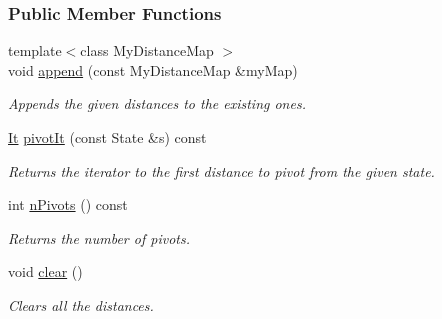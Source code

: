 \subsubsection*{Public Member Functions}
\begin{DoxyCompactItemize}
\item 
{\footnotesize template$<$class My\+Distance\+Map $>$ }\\void \hyperlink{structslb_1_1ext_1_1heuristic_1_1differential_1_1DistancesToPivots_3_01State_00_01Index_00_01IndexKind_1_1none_01_4_a126e633fa3a611519726896247b33527}{append} (const My\+Distance\+Map \&my\+Map)
\begin{DoxyCompactList}\small\item\em Appends the given distances to the existing ones. \end{DoxyCompactList}\item 
\hyperlink{structslb_1_1ext_1_1heuristic_1_1differential_1_1DistancesToPivots_3_01State_00_01Index_00_01IndexKind_1_1none_01_4_a718032b836ed77cb94b3c37389c0d5ed}{It} \hyperlink{structslb_1_1ext_1_1heuristic_1_1differential_1_1DistancesToPivots_3_01State_00_01Index_00_01IndexKind_1_1none_01_4_ace3b1e082a65142bb9f6f23dea9ed0e1}{pivot\+It} (const State \&s) const 
\begin{DoxyCompactList}\small\item\em Returns the iterator to the first distance to pivot from the given state. \end{DoxyCompactList}\item 
int \hyperlink{structslb_1_1ext_1_1heuristic_1_1differential_1_1DistancesToPivots_3_01State_00_01Index_00_01IndexKind_1_1none_01_4_af8c3961a29a41a2cc9a1d04dfe407f80}{n\+Pivots} () const 
\begin{DoxyCompactList}\small\item\em Returns the number of pivots. \end{DoxyCompactList}\item 
void \hyperlink{structslb_1_1ext_1_1heuristic_1_1differential_1_1DistancesToPivots_3_01State_00_01Index_00_01IndexKind_1_1none_01_4_a4335318626588baa4d08652ec67f1890}{clear} ()\hypertarget{structslb_1_1ext_1_1heuristic_1_1differential_1_1DistancesToPivots_3_01State_00_01Index_00_01IndexKind_1_1none_01_4_a4335318626588baa4d08652ec67f1890}{}\label{structslb_1_1ext_1_1heuristic_1_1differential_1_1DistancesToPivots_3_01State_00_01Index_00_01IndexKind_1_1none_01_4_a4335318626588baa4d08652ec67f1890}

\begin{DoxyCompactList}\small\item\em Clears all the distances. \end{DoxyCompactList}\end{DoxyCompactItemize}
